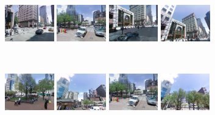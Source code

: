 \documentclass[table]{article} %
\begin{document}
\begin{figure}
        \begin{minipage}{0.75\linewidth}
            \begin{minipage}{\linewidth} 
                \colorbox{myGreen}{\includegraphics[height=16mm]{imgs/ex2/FVsvm1}}
                \colorbox{myGreen}{\includegraphics[height=16mm]{imgs/ex2/FVsvm2}}
                \colorbox{myGreen}{\includegraphics[height=16mm]{imgs/ex2/FVsvm3}}
                \colorbox{myGreen}{\includegraphics[height=16mm]{imgs/ex2/FVsvm4}}
            \end{minipage}
            \\
            \begin{minipage}{\linewidth}
                \colorbox{myRed}{\includegraphics[height=16mm]{imgs/ex2/FV1}}
                \colorbox{myRed}{\includegraphics[height=16mm]{imgs/ex2/FV2}}
                \colorbox{myRed}{\includegraphics[height=16mm]{imgs/ex2/FV3}}
                \colorbox{myRed}{\includegraphics[height=16mm]{imgs/ex2/FV4}}

\end{minipage}
\end{minipage}
\end{figure}
\end{document}
